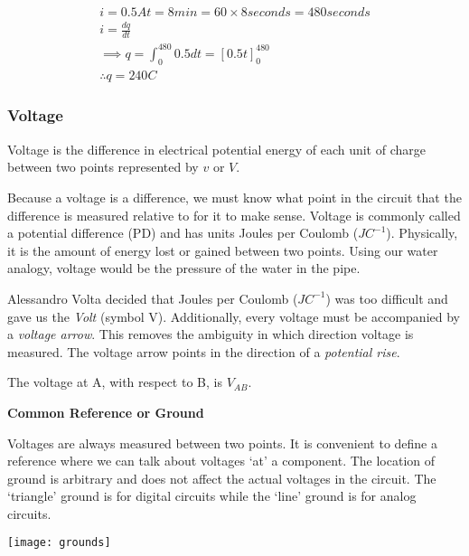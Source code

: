 \documentclass[12pt]{article}
\begin{document}
\begin{example}
  \begin{gather*}
    i = 0.5\unit{A } 
    t = 8\unit{min} = 60 \times 8 \unit{seconds} = 480\unit{seconds} \\
    i = \frac{dq}{dt} \\
    \implies q = \int_0^{480}0.5dt = [0.5t]_0^{480} \\
    \therefore q = 240\unit{C}
  \end{gather*}
\end{example}

\subsubsection{Voltage}
\begin{definition*}
  Voltage is the difference in electrical potential energy of each unit of charge between two points represented by $v$ or $V$.
\end{definition*}

Because a voltage is a difference, we must know what point in the circuit that the difference is measured relative to for it to make sense.
Voltage is commonly called a potential difference (PD) and has units Joules per Coulomb ($\unit{JC}^{-1}$).
Physically, it is the amount of energy lost or gained between two points. 
Using our water analogy, voltage would be the pressure of the water in the pipe.

Alessandro Volta decided that Joules per Coulomb ($\unit{JC}^{-1}$) was too difficult and gave us the \textit{Volt} (symbol V).
Additionally, every voltage must be accompanied by a \textit{voltage arrow}. 
This removes the ambiguity in which direction voltage is measured. 
The voltage arrow points in the direction of a \textit{potential rise}.

The voltage at A, with respect to B, is $V_{AB}$. 

\begin{theorem*}
  \textbf{Common Reference or Ground}

  Voltages are always measured between two points.
  It is convenient to define a reference where we can talk about voltages `at' a component.
  The location of ground is arbitrary and does not affect the actual voltages in the circuit.
  The `triangle' ground is for digital circuits while the `line' ground is for analog circuits.
\end{theorem*}
\begin{marginfigure}
  \vspace{ -1.8cm }
  \texttt{[image: grounds]}
\end{marginfigure}
\end{document}
